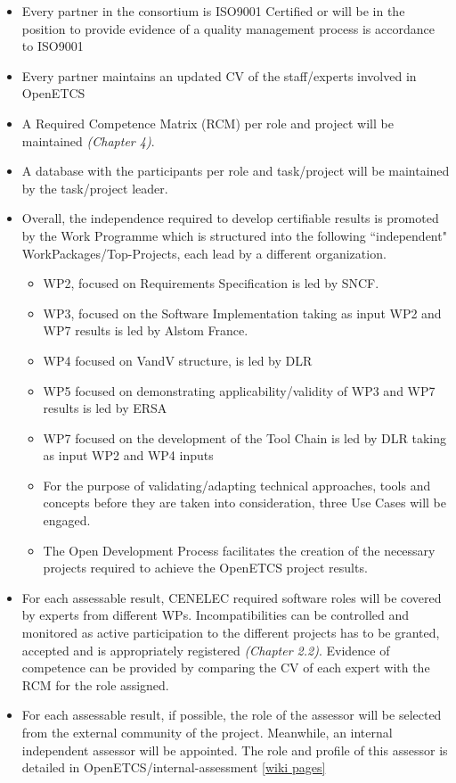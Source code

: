 \documentclass{template/openetcs_article}
\begin{document}
\begin{itemize}
\item Every partner in the consortium is ISO9001 Certified or will be in the position to provide evidence of a quality management process is accordance to ISO9001
\item Every partner maintains an updated CV of the staff/experts involved in OpenETCS
\item A Required Competence Matrix (RCM) per role and project will be maintained \textit{(Chapter 4)}.
\item A database with the participants per role and task/project will be maintained by the task/project leader.
\item Overall, the independence required to develop certifiable results is promoted by the Work Programme which is structured into the following “independent" WorkPackages/Top-Projects, each lead by a different organization.  
\begin{itemize}
\item WP2, focused on Requirements Specification is led by SNCF.
\item WP3, focused on the Software Implementation taking as input WP2 and WP7 results is led by Alstom France.
\item WP4 focused on \gls{VandV} structure, is led by DLR
\item WP5 focused on demonstrating applicability/validity of WP3 and WP7 results is led by ERSA
\item WP7 focused on the development of the Tool Chain is led by DLR taking as input WP2 and WP4 inputs
\item For the purpose of validating/adapting technical approaches, tools and concepts before they are taken into consideration, three Use Cases will be engaged.
\item The Open Development Process facilitates the creation of the necessary projects required to achieve the OpenETCS project results.
\end{itemize}
\item For each assessable result, CENELEC required software roles will be covered by experts from different WPs. Incompatibilities can be controlled and monitored as active participation to the different projects has to be granted, accepted and is appropriately registered  \textit{(Chapter 2.2)}. Evidence of competence can be provided by comparing the CV of each expert with the RCM for the role assigned.
\item For each assessable result, if possible, the role of the \gls{assessor} will be selected from the external community of the project. Meanwhile, an internal independent \gls{assessor} will be appointed. The role and profile of this \gls{assessor} is detailed in OpenETCS/internal-assessment \citep{IA} \href{https://github.com/openETCS/ecosystem/wiki/WP4:-internal-assessment}{[wiki pages]}
\end{itemize}
\end{document}
